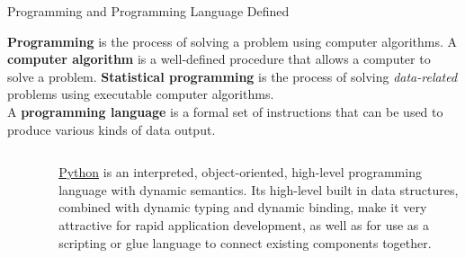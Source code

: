 \documentclass[pdf]{beamer}
\newcommand{\empr}[1]{{\color{franklinblue}\textbf{#1}}}
\theoremstyle{remark}
\theoremstyle{definition}
\begin{document}
\begin{frame}[t]{Programming and Programming Language Defined}

\empr{Programming} is the process of solving a problem using computer algorithms. A \empr{computer algorithm} is a well-defined procedure that allows a computer to solve a problem.  \empr{Statistical programming} is the process of solving \textit{data-related} problems using executable computer algorithms. \\
\vspace{1.5ex}
A \empr{programming language} is a formal set of instructions that can be used to produce various kinds of data output. \\
\vspace{1.5ex}
\begin{columns}[T]
\begin{column}{0.2\textwidth}
\begin{figure}[htbp]
  \captionsetup{justification=centering}
  \includegraphics[height=0.8cm, trim=0.1cm 0.1cm 0.1cm 0.1cm width=0.75cm]{Images/Python.png}
\end{figure} 
\end{column}
\begin{column}{0.7\textwidth}  %
\href{https://www.python.org/}{Python} is an interpreted, object-oriented, high-level programming language with dynamic semantics. Its high-level built in data structures, combined with dynamic typing and dynamic binding, make it very attractive for rapid application development, as well as for use as a scripting or glue language to connect existing components together. 
\end{column}
\end{columns}
\end{frame}
\end{document}
